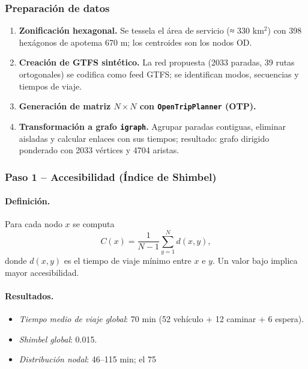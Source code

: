 \documentclass[openany]{book}
\begin{document}
		\subsubsection*{Preparación de datos}
		\begin{enumerate}
		  \item \textbf{Zonificación hexagonal.} Se tessela el área de servicio (≈ 330 km$^{2}$) con 398 hexágonos de apotema 670 m; los centroides son los nodos OD.
		  \item \textbf{Creación de GTFS sintético.} La red propuesta (2033 paradas, 39 rutas ortogonales) se codifica como feed GTFS; se identifican modos, secuencias y tiempos de viaje.
		  \item \textbf{Generación de matriz $N\times N$ con \texttt{OpenTripPlanner} (OTP).}
		  \item \textbf{Transformación a grafo \texttt{igraph}.} Agrupar paradas contiguas, eliminar aisladas y calcular enlaces con sus tiempos; resultado: grafo dirigido ponderado con 2033 vértices y 4704 aristas.
		\end{enumerate}

		\subsubsection*{Paso 1 – Accesibilidad (Índice de Shimbel)}
		\paragraph{Definición.} Para cada nodo $x$ se computa
		\[
		C(x)=\frac{1}{N-1}\sum_{y=1}^{N} d(x,y),
		\]
		donde $d(x,y)$ es el tiempo de viaje mínimo entre $x$ e $y$. Un valor bajo implica mayor accesibilidad.

		\paragraph{Resultados.}
		\begin{itemize}
		  \item \textit{Tiempo medio de viaje global}: 70 min (52 vehículo + 12 caminar + 6 espera).
		  \item \textit{Shimbel global}: 0.015.
		  \item \textit{Distribución nodal}: 46–115 min; el 75 %
		\end{itemize}
\end{document}
